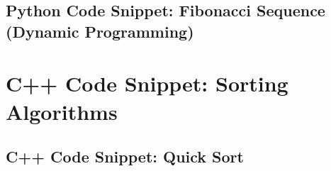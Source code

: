 \subsection{Python Code Snippet: Fibonacci Sequence (Dynamic Programming)}
\begin{codesnippet}
\end{codesnippet}


\section{C++ Code Snippet: Sorting Algorithms}

\subsection{C++ Code Snippet: Quick Sort}
\begin{codesnippet}
\end{codesnippet}


